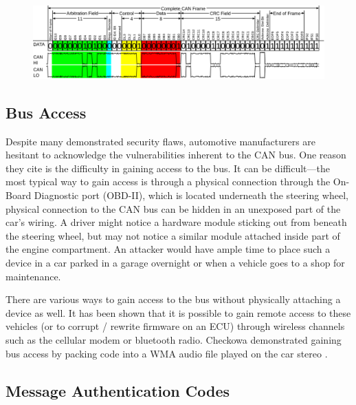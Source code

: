 	\begin{figure}
		\centering
		\includegraphics[width=\linewidth]{figures/can_frame.png}
	\end{figure}

\subsection{Bus Access}

Despite many demonstrated security flaws, automotive manufacturers are hesitant to acknowledge the vulnerabilities inherent to the CAN bus. One reason they cite is the difficulty in gaining access to the bus. It can be difficult---the most typical way to gain access is through a physical connection through the On-Board Diagnostic port (OBD-II), which is located underneath the steering wheel, physical connection to the CAN bus can be hidden in an unexposed part of the car's wiring. A driver might notice a hardware module sticking out from beneath the steering wheel, but may not notice a similar module attached inside part of the engine compartment. An attacker would have ample time to place such a device in a car parked in a garage overnight or when a vehicle goes to a shop for maintenance.

There are various ways to gain access to the bus without physically attaching a device as well. It has been shown that it is possible to gain remote access to these vehicles (or to corrupt / rewrite firmware on an ECU) through wireless channels such as the cellular modem or bluetooth radio. Checkowa demonstrated gaining bus access by packing code into a WMA audio file played on the car stereo \cite{Checkoway-2011}. 

\subsection{Message Authentication Codes}

